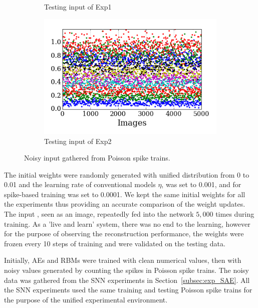 \begin{figure}
\begin{subfigure}[t]{0.48\textwidth}
		\caption{Testing input of Exp1}
	\end{subfigure}
	\begin{subfigure}[t]{0.48\textwidth}
		\includegraphics[width=\textwidth]{pics_sdlm/21_exp_AE_noise/exp2.png}
		\caption{Testing input of Exp2}
	\end{subfigure}
	\caption{Noisy input gathered from Poisson spike trains.}
	\label{fig:noise_input}
\end{figure}

The initial weights were randomly generated with unified distribution from 0 to 0.01 and the learning rate of conventional models $\eta$, was set to 0.001, and for spike-based training was set to 0.0001.
We kept the same initial weights for all the experiments thus providing an accurate comparison of the weight updates.
The input \DIFdelbegin {}\DIFdelend \DIFaddbegin {}\DIFaddend , seen as an image, repeatedly fed into the network $5,000$ times during training.
\DIFaddbegin {}\DIFaddend As a 'live and learn' system, there was no end to the learning, however for the purpose of observing the reconstruction performance, the weights were frozen every 10 steps of training and were validated on the testing data. 

Initially, AEs and RBMs were trained with clean numerical values, then with noisy values generated by counting the spikes in Poisson spike trains.
The noisy data was gathered from the SNN experiments in Section~\ref{subsec:exp_SAE}.
All the SNN experiments used the same training and testing Poisson spike trains for the purpose of the unified experimental environment.

